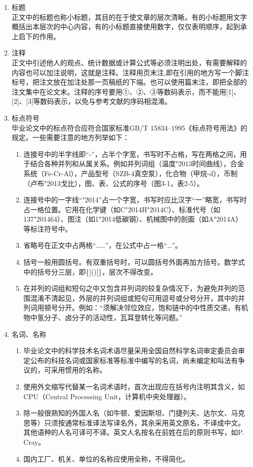 \documentclass{HDU-Bachelor-Thesis}
\begin{document}
\begin{enumerate}

    \item 标题\\
    正文中的标题也称小标题，其目的在于使文章的层次清晰。有的小标题用文字概括出本层次的中心内容，有的小标题直接使用数字，仅仅表明顺序，起到承上启下的作用。

    \item 注释\\
    正文中引述他人的观点、统计数据或计算公式等必须注明出处，有需要解释的内容也可以加注说明，这就是注释。注释用页末注,即在引用的地方写一个脚注标号，把注文放在加注处那一页稿纸的下端。也可以使用篇末注，即把全部的注文集中在论文末。注释的序号要用①、②、③等数码表示，而不能用[1]、[2]、[3]等数码表示，以免与参考文献的序码相混淆。

    \item 标点符号\\
    毕业论文中的标点符合应符合国家标准GB/T 15834--1995《标点符号用法》\cite{gbt15834-1995}的规定。一些需要注意的地方列举如下：
    \begin{enumerate}
        \item 连接号中的半字线即“-”，占半个字宽，书写时不占格，写在两格之间，用于结合各种并列和从属关系。例如并列词组（温度\char"2013{}时间曲线），合金系统（Fe-Cr-Al），产品型号（SZB-4真空泵），化合物（甲烷-d），币制（卢布\char"2013{}戈比），图、表、公式的序号（图3-1，表2-5）。
        \item 连接号中的一字线“\char"2014{}”占一个字宽，书写时应比汉字“一”略宽，书写时占一格位置。它用在化学键（如C\char"2014{}H\char"2014{}C）、标准代号（如137\char"2014{}64）、图注（如1\char"2014{}低碳钢）、机械图中的剖面（如A\char"2014{}A）等标注符号中。
        \item 省略号在正文中占两格“……”，在公式中占一格“…”。
        \item 括号一般用圆括号。有双重括号时，可以圆括号外面再加方括号。数学式中的括号分三层，即\{[()]\}，层次不得改变。
        \item 在并列的词组和短句之中又包含并列词的较复杂情况下，为避免并列的范围混淆不清起见，外层的并列词组或短句可用逗号或分号分开，其中的并列词用顿号分开。例如：“须解决邻位效应，饱和链中的中性质交递，有机物中氢分子、卤分子的活动性，瓦耳登转化等问题。”
    \end{enumerate}

    \item 名词、名称
    \begin{enumerate}
        \item 毕业论文中的科学技术名词术语尽量采用全国自然科学名词审定委员会审定公布的科技名词或国家标准等标准中编写的名词，尚未编定和叫法有争议的，可采用惯用的名称。
        \item 使用外文缩写代替某一名词术语时，首次出现应在括号内注明其含义，如CPU（Central Processing Unit，计算机中央处理器）。
        \item 除一般很熟知的外国人名（如牛顿、爱因斯坦、门捷列夫、达尔文、马克思等）只须按通常标准译法写译名外，其余采用英文原名，不译成中文。其他语种的人名可译可不译。英文人名按名在前姓在后的原则书写，如P. Cray。
        \item 国内工厂、机关、单位的名称应使用全称，不得简化。
    \end{enumerate}


\end{enumerate}
\end{document}
